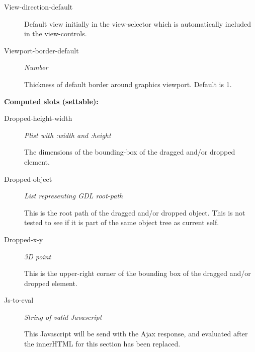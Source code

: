 \documentclass [11pt]{book}
\begin{document}
\begin{itemize}
\begin{description}
\item [View-direction-default]

Default view initially in the view-selector which is
automatically included in the view-controls.




\item [Viewport-border-default]
\emph{Number}

 Thickness of default border around graphics viewport.
Default is 1.




\end{description}






\textbf{
\underline{Computed slots (settable):}}

\begin{description}

\item [Dropped-height-width]
\emph{Plist with :width and :height}

 The dimensions of the bounding-box of the dragged and/or dropped element.




\item [Dropped-object]
\emph{List representing GDL root-path}

 This is the root path of the dragged and/or dropped object.
This is not tested to see if it is part of the same object tree as current self.




\item [Dropped-x-y]
\emph{3D point}

 This is the upper-right corner of the bounding box of the dragged and/or dropped element.




\item [Js-to-eval]
\emph{String of valid Javascript}

 This Javascript will be send with the Ajax response,
and evaluated after the innerHTML for this section has been replaced.




\end{description}







\end{itemize}
\end{document}
